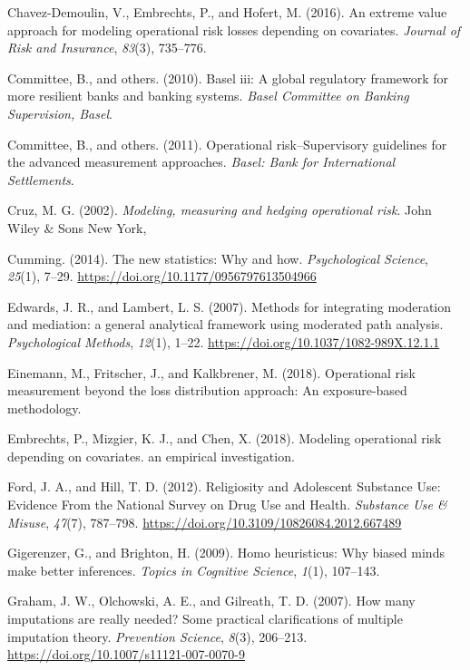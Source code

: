 \documentclass[]{DissertateUSU}
\begin{document}
\hypertarget{ref-chavez2016extreme}{}
Chavez-Demoulin, V., Embrechts, P., and Hofert, M. (2016). An extreme
value approach for modeling operational risk losses depending on
covariates. \emph{Journal of Risk and Insurance}, \emph{83}(3),
735--776.

\hypertarget{ref-basel2010basel}{}
Committee, B., and others. (2010). Basel iii: A global regulatory
framework for more resilient banks and banking systems. \emph{Basel
Committee on Banking Supervision, Basel}.

\hypertarget{ref-basel2011operational}{}
Committee, B., and others. (2011). Operational risk--Supervisory
guidelines for the advanced measurement approaches. \emph{Basel: Bank
for International Settlements}.

\hypertarget{ref-cruz2002modeling}{}
Cruz, M. G. (2002). \emph{Modeling, measuring and hedging operational
risk}. John Wiley \& Sons New York,

\hypertarget{ref-Cumming2014}{}
Cumming. (2014). The new statistics: Why and how. \emph{Psychological
Science}, \emph{25}(1), 7--29.
\url{https://doi.org/10.1177/0956797613504966}

\hypertarget{ref-Edwards2007}{}
Edwards, J. R., and Lambert, L. S. (2007). Methods for integrating
moderation and mediation: a general analytical framework using moderated
path analysis. \emph{Psychological Methods}, \emph{12}(1), 1--22.
\url{https://doi.org/10.1037/1082-989X.12.1.1}

\hypertarget{ref-einemann2018operational}{}
Einemann, M., Fritscher, J., and Kalkbrener, M. (2018). Operational risk
measurement beyond the loss distribution approach: An exposure-based
methodology.

\hypertarget{ref-embrechts2018modeling}{}
Embrechts, P., Mizgier, K. J., and Chen, X. (2018). Modeling operational
risk depending on covariates. an empirical investigation.

\hypertarget{ref-Ford2012}{}
Ford, J. A., and Hill, T. D. (2012). Religiosity and Adolescent
Substance Use: Evidence From the National Survey on Drug Use and Health.
\emph{Substance Use \& Misuse}, \emph{47}(7), 787--798.
\url{https://doi.org/10.3109/10826084.2012.667489}

\hypertarget{ref-gigerenzer2009homo}{}
Gigerenzer, G., and Brighton, H. (2009). Homo heuristicus: Why biased
minds make better inferences. \emph{Topics in Cognitive Science},
\emph{1}(1), 107--143.

\hypertarget{ref-Graham2007}{}
Graham, J. W., Olchowski, A. E., and Gilreath, T. D. (2007). How many
imputations are really needed? Some practical clarifications of multiple
imputation theory. \emph{Prevention Science}, \emph{8}(3), 206--213.
\url{https://doi.org/10.1007/s11121-007-0070-9}
\end{document}

